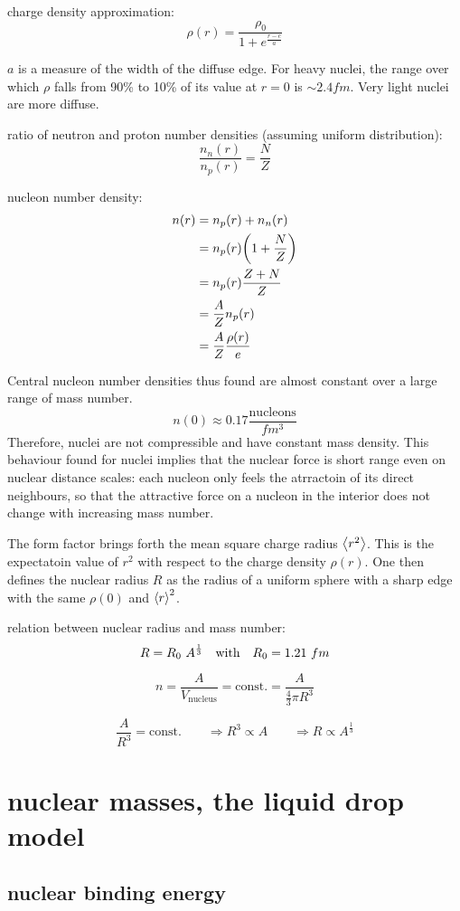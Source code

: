 \documentclass[10pt, a4paper, twocolumn]{article}
\begin{document}
charge density approximation:
\[\rho (r) = \frac{\rho _0}{1+e^\frac{r-c}{a}}\]

$a$ is a measure of the width of the diffuse edge. For heavy nuclei, the range over which $\rho$ falls from 90\% to 10\% of its value at $r=0$ is $\sim 2.4fm$. Very light nuclei are more diffuse.

ratio of neutron and proton number densities (assuming uniform distribution):
\[\frac{n_n(r)}{n_p(r)}=\frac{N}{Z}\]

nucleon number density:
\begin{equation*}
\begin{aligned}
n(r)&=n_p(r)+n_n(r)
\\&=n_p(r)\qty(1+\frac{N}{Z})
\\&=n_p(r)\frac{Z+N}{Z}
\\&=\frac{A}{Z}n_p(r)
\\&=\frac{A}{Z}\frac{\rho (r)}{e}
\end{aligned}
\end{equation*}

Central nucleon number densities thus found are almost constant over a large range of mass number.
\[n(0)\approx 0.17\frac{\text{nucleons}}{fm^3}\]
Therefore, nuclei are not compressible and have constant mass density. This behaviour found for nuclei implies that the nuclear force is short range even on nuclear distance scales: each nucleon only feels the atrractoin of its direct neighbours, so that the attractive force on a nucleon in the interior does not change with increasing mass number.

The form factor brings forth the mean square charge radius $\expval{r^2}$. This is the expectatoin value of $r^2$ with respect to the charge density $\rho (r)$. One then defines the nuclear radius $R$ as the radius of a uniform sphere with a sharp edge with the same $\rho(0)$ and $\expval r^2$.

relation between nuclear radius and mass number:
\[R=R_0\ A^\frac13 \qq{with} R_0 = 1.21\ fm\]

\[n=\frac{A}{V_\text{nucleus}}=\text{const.}
=\frac{A}{\frac43 \pi R^3}\]

\[\frac{A}{R^3}=\text{const.}
\qquad \Rightarrow R^3 \propto A
\qquad \Rightarrow R\propto A^\frac13 \]

\section{nuclear masses, the liquid drop model}
\subsection{nuclear binding energy}
\end{document}
